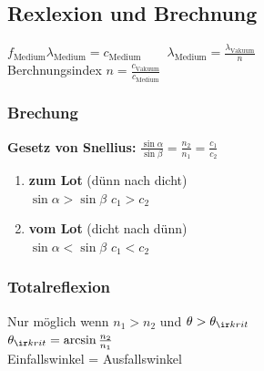 \begin{sectionbox}
    \subsection{Rexlexion und Brechnung}
    $f_{\text{Medium}}\lambda_{\text{Medium}} = c_{\text{Medium}} \qquad \lambda_{\text{Medium}} = \frac{\lambda_{\text{Vakuum}}}{n}$\\
    Berchnungsindex $n=\frac{c_\text{Vakuum}}{c_{\text{Medium}}}$
    \subsubsection{Brechung}
    \begin{emphbox}
        \textbf{Gesetz von Snellius:}
        $\frac{\sin \alpha}{\sin \beta} = \frac{n_2}{n_1} = \frac {c_1}{c_2}$
    \end{emphbox}
    \begin{enumerate}
        \item[A)] \textbf{zum Lot} (dünn nach dicht)\\
              $\sin \alpha > \sin \beta$ \qquad $c_1 > c_2$
        \item[B)] \textbf{vom Lot} (dicht nach dünn)\\
              $\sin \alpha < \sin \beta$ \qquad $c_1 < c_2$
    \end{enumerate}
    \subsubsection{Totalreflexion}
    Nur möglich wenn $n_1 > n_2$ und $\theta > \theta_{\ir krit}$ \\
    $\theta_{\ir krit} = \arcsin \frac{n_2}{n_1}$\\
    Einfallswinkel = Ausfallswinkel
\end{sectionbox}

